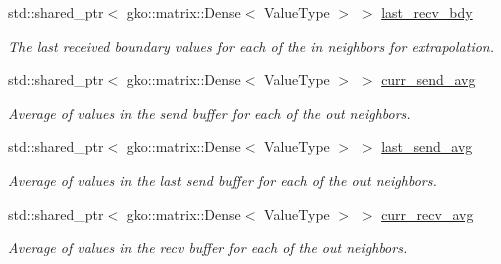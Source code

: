 \begin{DoxyCompactItemize}
\mbox{\label{structschwz_1_1Communicate_1_1comm__struct_a68ae17fc0df0139f44e0e0675e1f350b}} 
std\+::shared\+\_\+ptr$<$ gko\+::matrix\+::\+Dense$<$ Value\+Type $>$ $>$ \hyperlink{structschwz_1_1Communicate_1_1comm__struct_a68ae17fc0df0139f44e0e0675e1f350b}{last\+\_\+recv\+\_\+bdy}
\begin{DoxyCompactList}\small\item\em The last received boundary values for each of the in neighbors for extrapolation. \end{DoxyCompactList}\item 
\mbox{\label{structschwz_1_1Communicate_1_1comm__struct_ab11efe0dbfb7e5c51c637079ac3e9f48}} 
std\+::shared\+\_\+ptr$<$ gko\+::matrix\+::\+Dense$<$ Value\+Type $>$ $>$ \hyperlink{structschwz_1_1Communicate_1_1comm__struct_ab11efe0dbfb7e5c51c637079ac3e9f48}{curr\+\_\+send\+\_\+avg}
\begin{DoxyCompactList}\small\item\em Average of values in the send buffer for each of the out neighbors. \end{DoxyCompactList}\item 
\mbox{\label{structschwz_1_1Communicate_1_1comm__struct_a24b0b5fb1bd9ca5338e90594b564a7a4}} 
std\+::shared\+\_\+ptr$<$ gko\+::matrix\+::\+Dense$<$ Value\+Type $>$ $>$ \hyperlink{structschwz_1_1Communicate_1_1comm__struct_a24b0b5fb1bd9ca5338e90594b564a7a4}{last\+\_\+send\+\_\+avg}
\begin{DoxyCompactList}\small\item\em Average of values in the last send buffer for each of the out neighbors. \end{DoxyCompactList}\item 
\mbox{\label{structschwz_1_1Communicate_1_1comm__struct_a2c19ee506240e91d5d68a5dc428053d2}} 
std\+::shared\+\_\+ptr$<$ gko\+::matrix\+::\+Dense$<$ Value\+Type $>$ $>$ \hyperlink{structschwz_1_1Communicate_1_1comm__struct_a2c19ee506240e91d5d68a5dc428053d2}{curr\+\_\+recv\+\_\+avg}
\begin{DoxyCompactList}\small\item\em Average of values in the recv buffer for each of the out neighbors. \end{DoxyCompactList}\item 

\end{DoxyCompactItemize}
